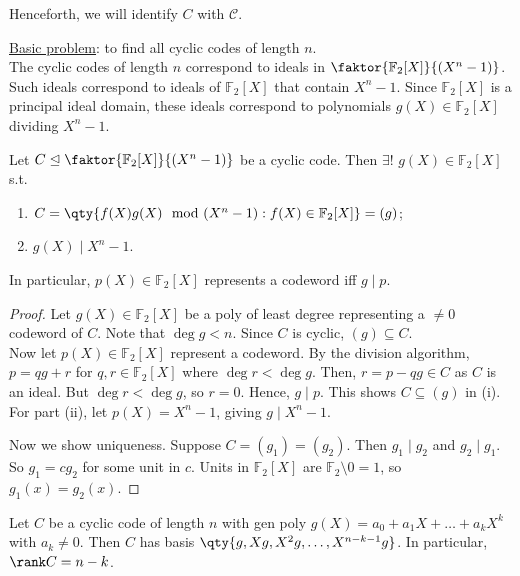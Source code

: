 Henceforth, we will identify $C$ with $\mathcal C$.

\underline{Basic problem}: to find all cyclic codes of length $n$. \\
The cyclic codes of length $n$ correspond to ideals in $\faktor{\mathbb F_2[X]}{(X^n - 1)}$.
Such ideals correspond to ideals of $\mathbb F_2[X]$ that contain $X^n - 1$.
Since $\mathbb F_2[X]$ is a principal ideal domain, these ideals correspond to polynomials $g(X) \in \mathbb F_2[X]$ dividing $X^n - 1$.

\begin{theorem}
    Let $C \trianglelefteq \faktor{\mathbb F_2[X]}{(X^n - 1)}$ be a cyclic code.
    Then $\exists!$  $g(X) \in \mathbb F_2[X]$ s.t.
    \begin{enumerate}
        \item $C = \qty{f(X) g(X) \mod (X^n -1) : f(X) \in \mathbb{F}_2[X]} = (g)$;
        \item $g(X) \mid X^n - 1$.
    \end{enumerate}
    In particular, $p(X) \in \mathbb F_2[X]$ represents a codeword iff $g \mid p$.
\end{theorem}

\begin{proof}
    Let $g(X) \in \mathbb F_2[X]$ be a poly of least degree representing a $\neq 0$ codeword of $C$.
    Note that $\deg g < n$.
    Since $C$ is cyclic, $(g) \subseteq C$. \\
    Now let $p(X) \in \mathbb F_2[X]$ represent a codeword.
    By the division algorithm, $p = qg + r$ for $q, r \in \mathbb F_2[X]$ where $\deg r < \deg g$.
    Then, $r = p - qg \in C$ as $C$ is an ideal.
    But $\deg r < \deg g$, so $r = 0$.
    Hence, $g \mid p$.
    This shows $C \subseteq (g)$ in (i). \\
    For part (ii), let $p(X) = X^n - 1$, giving $g \mid X^n - 1$.

    Now we show uniqueness.
    Suppose $C = (g_1) = (g_2)$.
    Then $g_1 \mid g_2$ and $g_2 \mid g_1$.
    So $g_1 = cg_2$ for some unit in $c$.
    Units in $\mathbb{F}_2[X]$ are $\mathbb{F}_2 \setminus \qty{0} = \qty{1}$, so $g_1(x) = g_2(x)$.
\end{proof}

\begin{lemma}
    Let $C$ be a cyclic code of length $n$ with gen poly $g(X) = a_0 + a_1 X + \dots + a_k X^k$ with $a_k \neq 0$.
    Then $C$ has basis $\qty{g, Xg, X^2g, \dots, X^{n-k-1}g}$.
    In particular, $\rank C = n - k$.
\end{lemma}


